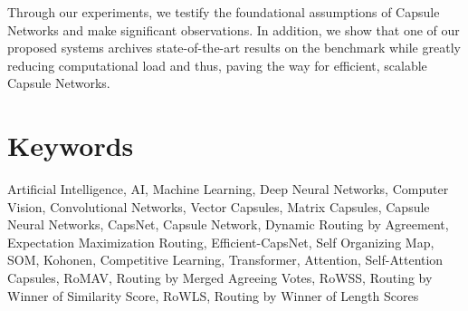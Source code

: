 \begin{otherlanguage}{english}
Through our experiments, we testify the foundational assumptions of Capsule Networks and make significant observations. In addition, we show that one of our proposed systems archives state-of-the-art results on the  benchmark while greatly reducing computational load and thus, paving the way for efficient, scalable Capsule Networks.
\section*{Keywords}
\noindent
Artificial Intelligence, AI, Machine Learning, Deep Neural Networks, Computer Vision, Convolutional Networks, Vector Capsules, Matrix Capsules, Capsule Neural Networks, CapsNet, Capsule Network, Dynamic Routing by Agreement, Expectation Maximization Routing, Efficient-CapsNet, Self Organizing Map, SOM, Kohonen, Competitive Learning, Transformer, Attention, Self-Attention Capsules, RoMAV, Routing by Merged Agreeing Votes, RoWSS, Routing by Winner of Similarity Score, RoWLS, Routing by Winner of Length Scores

\end{otherlanguage}
